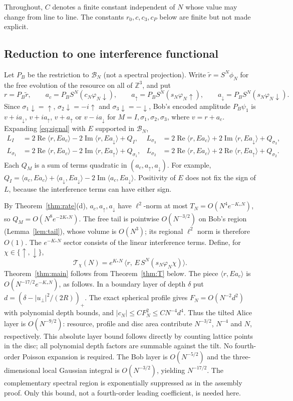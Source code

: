 \documentclass[11pt]{amsart}
\theoremstyle{definition}
\theoremstyle{remark}
\newcommand{\Z}{\mathbb{Z}}
\newcommand{\cB}{\mathcal{B}}
\newcommand{\up}{{\uparrow}}
\newcommand{\dn}{{\downarrow}}
\newcommand{\re}{\operatorname{Re}}
\newcommand{\im}{\operatorname{Im}}
\begin{document}
Throughout, $C$ denotes a finite constant independent of $N$ whose value may
change from line to line.  The constants $r_0,c,c_3,c_P$ below are finite
but not made explicit.

\subsection{Reduction to one interference functional}
Let $P_B$ be the restriction to $\cB_N$ (not a spectral projection).  Write
$\widetilde r=S^N\phi_N$ for the free evolution of the resource on all of
$\Z^3$, and put
\[
r=P_B\widetilde r,\qquad a_c=P_BS^N(c_N\varphi_N\dn),\qquad
a_\up=P_BS^N(s_N\varphi_N\up),\qquad a_\dn=P_BS^N(s_N\varphi_N\dn).
\]
Since $\sigma_1\dn=\up$, $\sigma_2\dn=-i\up$ and $\sigma_3\dn=-\dn$, Bob's
encoded amplitude $P_B\psi_1$ is $v+ia_\dn$, $v+ia_\up$, $v+a_\up$ or
$v-ia_\dn$ for $M=I,\sigma_1,\sigma_2,\sigma_3$, where $v=r+a_c$.  Expanding
\eqref{eq:signal} with $E$ supported in $\cB_N$,
\begin{equation}\label{eq:Lexp}
\begin{aligned}
L_{I}&=2\re\langle r,Ea_c\rangle-2\im\langle r,Ea_\dn\rangle+Q_I, &
L_{\sigma_3}&=2\re\langle r,Ea_c\rangle+2\im\langle r,Ea_\dn\rangle+Q_{\sigma_3},\\
L_{\sigma_1}&=2\re\langle r,Ea_c\rangle-2\im\langle r,Ea_\up\rangle+Q_{\sigma_1}, &
L_{\sigma_2}&=2\re\langle r,Ea_c\rangle+2\re\langle r,Ea_\up\rangle+Q_{\sigma_2}.
\end{aligned}
\end{equation}
Each $Q_M$ is a sum of terms quadratic in $(a_c,a_\up,a_\dn)$.  For
example, $Q_I=\langle a_c,Ea_c\rangle+\langle a_\dn,Ea_\dn\rangle-2\im\langle a_c,Ea_\dn\rangle$.
Positivity of $E$ does not fix the sign of $L$, because the interference
terms can have either sign.

By Theorem~\ref{thm:rate}(d), $a_c,a_\up,a_\dn$ have $\ell^2$-norm at most
$T_N=O(N^4e^{-K_*N})$, so $Q_M=O(N^{8}e^{-2K_*N})$.
The free tail is pointwise $O(N^{-3/2})$ on Bob's region
(Lemma~\ref{lem:tail}), whose volume is $O(N^3)$; its regional
$\ell^2$ norm is therefore $O(1)$. The $e^{-K_*N}$ sector consists of
the linear interference terms.  Define, for $\chi\in\{\up,\dn\}$,
\[
\mathcal T_\chi(N)=e^{K_*N}\,\bigl\langle r,\,E\,S^N(s_N\varphi_N\chi)\bigr\rangle .
\]
Theorem~\ref{thm:main} follows from Theorem~\ref{thm:T} below.  The piece
$\langle r,Ea_c\rangle$ is $O(N^{-17/2}e^{-K_*N})$, as follows.
In a boundary layer of depth $\delta$ put
$d=(\delta-|u_\perp|^2/(2R))_+$. The exact spherical profile gives
$F_N=O(N^{-2}d^2)$ with polynomial depth bounds, and
$|c_N|\le C F_N^2\le C N^{-4}d^4$.
Thus the tilted Alice layer is $O(N^{-9/2})$: resource, profile and
disc area contribute $N^{-3/2}$, $N^{-4}$ and $N$, respectively.
This absolute layer bound follows directly by counting lattice points in
the disc; all polynomial depth factors are summable against the tilt.
No fourth-order Poisson expansion is required.
The Bob layer is $O(N^{-5/2})$ and the three-dimensional local Gaussian
integral is $O(N^{-3/2})$, yielding $N^{-17/2}$.
The complementary spectral region is exponentially suppressed as in
the assembly proof. Only this bound, not a fourth-order leading
coefficient, is needed here.
\end{document}
